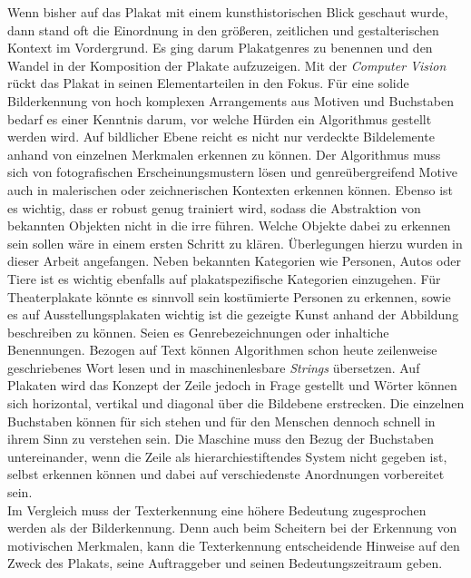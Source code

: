 \documentclass[a4paper,12pt,ngerman]{article}
\begin{document}
Wenn bisher auf das Plakat mit einem kunsthistorischen Blick geschaut wurde, dann stand oft die Einordnung in den größeren, zeitlichen und gestalterischen Kontext im Vordergrund. Es ging darum Plakatgenres zu benennen und den Wandel in der Komposition der Plakate aufzuzeigen. Mit der \textit{Computer Vision} rückt das Plakat in seinen Elementarteilen in den Fokus. Für eine solide Bilderkennung von hoch komplexen Arrangements aus Motiven und Buchstaben bedarf es einer Kenntnis darum, vor welche Hürden ein Algorithmus gestellt werden wird. Auf bildlicher Ebene reicht es nicht nur verdeckte Bildelemente anhand von einzelnen Merkmalen erkennen zu können. Der Algorithmus muss sich von fotografischen Erscheinungsmustern lösen und genreübergreifend Motive auch in malerischen oder zeichnerischen Kontexten erkennen können. Ebenso ist es wichtig, dass er robust genug trainiert wird, sodass die Abstraktion von bekannten Objekten nicht in die irre führen. Welche Objekte dabei zu erkennen sein sollen wäre in einem ersten Schritt zu klären. Überlegungen hierzu wurden in dieser Arbeit angefangen. Neben bekannten Kategorien wie Personen, Autos oder Tiere ist es wichtig ebenfalls auf plakatspezifische Kategorien einzugehen. Für Theaterplakate könnte es sinnvoll sein kostümierte Personen zu erkennen, sowie es auf Ausstellungsplakaten wichtig ist die gezeigte Kunst anhand der Abbildung beschreiben zu können. Seien es Genrebezeichnungen oder inhaltiche Benennungen. Bezogen auf Text können Algorithmen schon heute zeilenweise geschriebenes Wort lesen und in maschinenlesbare \textit{Strings} übersetzen. Auf Plakaten wird das Konzept der Zeile jedoch in Frage gestellt und Wörter können sich horizontal, vertikal und diagonal über die Bildebene erstrecken. Die einzelnen Buchstaben können für sich stehen und für den Menschen dennoch schnell in ihrem Sinn zu verstehen sein. Die Maschine muss den Bezug der Buchstaben untereinander, wenn die Zeile als hierarchiestiftendes System nicht gegeben ist, selbst erkennen können und dabei auf verschiedenste Anordnungen vorbereitet sein. \\
Im Vergleich muss der Texterkennung eine höhere Bedeutung zugesprochen werden als der Bilderkennung. Denn auch beim Scheitern bei der Erkennung von motivischen Merkmalen, kann die Texterkennung entscheidende Hinweise auf den Zweck des Plakats, seine Auftraggeber und seinen Bedeutungszeitraum geben. \\
\end{document}
